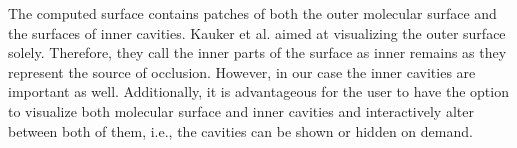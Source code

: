 
The computed surface contains patches of both the outer molecular surface and the surfaces of inner cavities.
Kauker et al. \cite{kauker2013rendering} aimed at visualizing the outer surface solely.
Therefore, they call the inner parts of the surface as inner remains as they represent the source of occlusion.
However, in our case the inner cavities are important as well.
Additionally, it is advantageous for the user to have the option to visualize both molecular surface and inner cavities and interactively alter between both of them, i.e., the cavities can be shown or hidden on demand.

